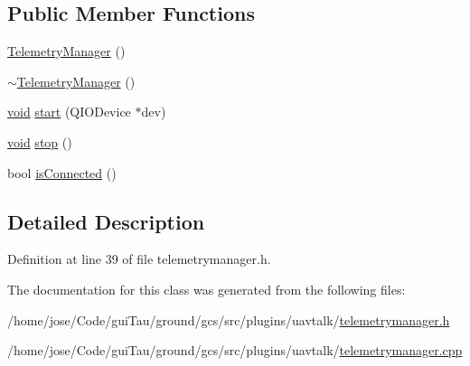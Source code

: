\subsection*{Public Member Functions}
\begin{DoxyCompactItemize}
\item 
\hyperlink{group___u_a_v_talk_plugin_gaab121ca26ff1b0985b013d715132a088}{Telemetry\-Manager} ()
\item 
\hyperlink{group___u_a_v_talk_plugin_ga28e48a3688e195cc9c3263ccdeb084c4}{$\sim$\-Telemetry\-Manager} ()
\item 
\hyperlink{group___u_a_v_objects_plugin_ga444cf2ff3f0ecbe028adce838d373f5c}{void} \hyperlink{group___u_a_v_talk_plugin_ga48c17e83f41b742abc5c234963093171}{start} (Q\-I\-O\-Device $\ast$dev)
\item 
\hyperlink{group___u_a_v_objects_plugin_ga444cf2ff3f0ecbe028adce838d373f5c}{void} \hyperlink{group___u_a_v_talk_plugin_ga59bfea54673b2ab51e9ac1bf3a186718}{stop} ()
\item 
bool \hyperlink{group___u_a_v_talk_plugin_ga73bf9fbd67f3eb0451363525de9cc7de}{is\-Connected} ()
\end{DoxyCompactItemize}


\subsection{Detailed Description}


Definition at line 39 of file telemetrymanager.\-h.



The documentation for this class was generated from the following files\-:\begin{DoxyCompactItemize}
\item 
/home/jose/\-Code/gui\-Tau/ground/gcs/src/plugins/uavtalk/\hyperlink{telemetrymanager_8h}{telemetrymanager.\-h}\item 
/home/jose/\-Code/gui\-Tau/ground/gcs/src/plugins/uavtalk/\hyperlink{telemetrymanager_8cpp}{telemetrymanager.\-cpp}\end{DoxyCompactItemize}
